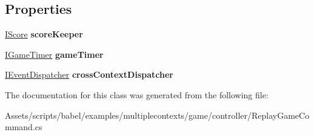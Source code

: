 \subsection*{Properties}
\begin{DoxyCompactItemize}
\item 
\hypertarget{classbabel_1_1examples_1_1multiplecontexts_1_1game_1_1_replay_game_command_a37ad23a296b22a4114130d214ffe1b9b}{\hyperlink{interfacebabel_1_1examples_1_1multiplecontexts_1_1game_1_1_i_score}{I\-Score} {\bfseries score\-Keeper}}\label{classbabel_1_1examples_1_1multiplecontexts_1_1game_1_1_replay_game_command_a37ad23a296b22a4114130d214ffe1b9b}

\item 
\hypertarget{classbabel_1_1examples_1_1multiplecontexts_1_1game_1_1_replay_game_command_a3a7e515fdcf3e5dfe742c5e1456a977b}{\hyperlink{interfacebabel_1_1examples_1_1multiplecontexts_1_1game_1_1_i_game_timer}{I\-Game\-Timer} {\bfseries game\-Timer}}\label{classbabel_1_1examples_1_1multiplecontexts_1_1game_1_1_replay_game_command_a3a7e515fdcf3e5dfe742c5e1456a977b}

\item 
\hypertarget{classbabel_1_1examples_1_1multiplecontexts_1_1game_1_1_replay_game_command_a25942ca5329c4a0a9050bc3386cf351b}{\hyperlink{interfacebabel_1_1extensions_1_1dispatcher_1_1eventdispatcher_1_1api_1_1_i_event_dispatcher}{I\-Event\-Dispatcher} {\bfseries cross\-Context\-Dispatcher}}\label{classbabel_1_1examples_1_1multiplecontexts_1_1game_1_1_replay_game_command_a25942ca5329c4a0a9050bc3386cf351b}

\end{DoxyCompactItemize}


The documentation for this class was generated from the following file\-:\begin{DoxyCompactItemize}
\item 
Assets/scripts/babel/examples/multiplecontexts/game/controller/Replay\-Game\-Command.\-cs\end{DoxyCompactItemize}
